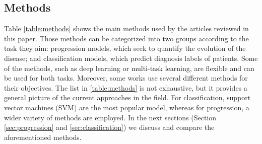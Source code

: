 \subsection{Methods}

Table \ref{table:methods} shows the main methods used by the articles reviewed in this paper. Those methods can be categorized into two groups according to the task they aim: progression models, which seek to quantify the evolution of the disease; and classification models, which predict diagnosis labels of patients. Some of the methods, such as deep learning or multi-task learning, are flexible and can be used for both tasks. Moreover, some works use several different methods for their objectives. The list in \ref{table:methods} is not exhaustive, but it provides a general picture of the current approaches in the field. For classification, support vector machines (SVM) are the most popular model, whereas for progression, a wider variety of methods are employed. In the next sections (Section \ref{sec:progression} and \ref{sec:classification}) we discuss and compare the aforementioned methods. 

